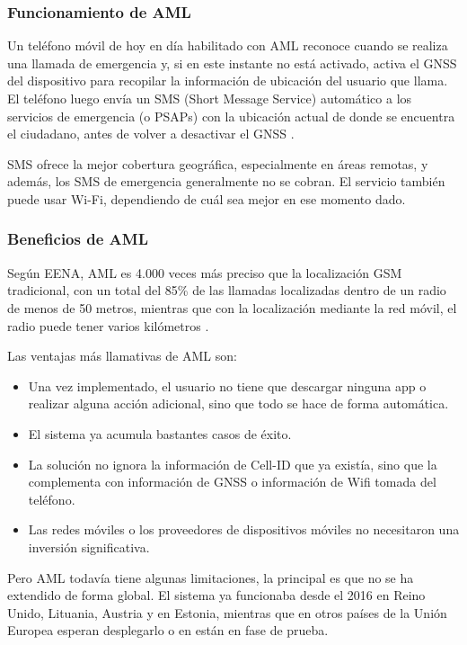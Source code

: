 \subsubsection{Funcionamiento de AML}

Un teléfono móvil de hoy en día habilitado con AML reconoce cuando se realiza una llamada de emergencia y, si en este instante no está activado, activa el GNSS del dispositivo para recopilar la información de ubicación del usuario que llama. El teléfono luego envía un SMS (Short Message Service) automático a los servicios de emergencia (o PSAPs) con la ubicación actual de donde se encuentra el ciudadano, antes de volver a desactivar el GNSS \cite{aml1}.

SMS ofrece la mejor cobertura geográfica, especialmente en áreas remotas, y además, los SMS de emergencia generalmente no se cobran. El servicio también puede usar Wi-Fi, dependiendo de cuál sea mejor en ese momento dado.

\subsubsection{Beneficios de AML}

Según EENA, AML es 4.000 veces más preciso que la localización GSM tradicional, con un total del 85\% de las llamadas localizadas dentro de un radio de menos de 50 metros, mientras que con la localización mediante la red móvil, el radio puede tener varios kilómetros \cite{aml4}.

Las ventajas más llamativas de AML son:

\begin{itemize}
  \item Una vez implementado, el usuario no tiene que descargar ninguna app o realizar alguna acción adicional, sino que todo se hace de forma automática.
  \item El sistema ya acumula bastantes casos de éxito.
  \item La solución no ignora la información de Cell-ID que ya existía, sino que la complementa con información de GNSS o información de Wifi tomada del teléfono.
  \item Las redes móviles o los proveedores de dispositivos móviles no necesitaron una inversión significativa.
\end{itemize}

Pero AML todavía tiene algunas limitaciones, la principal es que no se ha extendido de forma global. El sistema ya funcionaba desde el 2016 en Reino Unido, Lituania, Austria y en Estonia, mientras que en otros países de la Unión Europea esperan desplegarlo o en están en fase de prueba.

